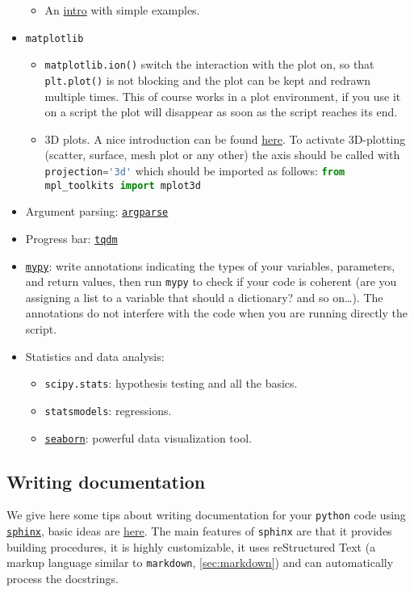 \documentclass[a4paper,12pt,%
              final%
              ]{article}
\begin{document}
\begin{itemize}
\begin{itemize}
      \item An \href{https://www.machinelearningplus.com/python/parallel-processing-python/}{intro} with simple examples.
    \end{itemize}
  \item \texttt{matplotlib}
    \begin{itemize}
      \item \texttt{matplotlib.ion()} switch the interaction with the plot on, so that \texttt{plt.plot()} is not blocking and the plot can be kept and redrawn multiple times. This of course works in a plot environment, if you use it on a script the plot will disappear as soon as the script reaches its end.
      \item 3D plots. A nice introduction can be found \href{https://jakevdp.github.io/PythonDataScienceHandbook/04.12-three-dimensional-plotting.html}{here}. To activate 3D-plotting (scatter, surface, mesh plot or any other) the axis should be called with \lstinline[language=python]{projection='3d'} which should be imported as follows: \lstinline[language=python]{from mpl_toolkits import mplot3d}
    \end{itemize}
  \item Argument parsing: \href{https://docs.python.org/3/library/argparse.html#module-argparse}{\texttt{argparse}}
  \item Progress bar: \href{https://github.com/tqdm/tqdm#manual}{\texttt{tqdm}}
  \item \href{https://mypy.readthedocs.io/en/stable/index.html}{\texttt{mypy}}: write annotations indicating the types of your variables, parameters, and return values, then run \texttt{mypy} to check if your code is coherent (are you assigning a list to a variable that should a dictionary? and so on\ldots). The annotations do not interfere with the code when you are running directly the script.
  \item Statistics and data analysis:
    \begin{itemize}
      \item \texttt{scipy.stats}: hypothesis testing and all the basics.
      \item \texttt{statsmodels}: regressions.
      \item \href{https://seaborn.pydata.org/introduction.html}{\texttt{seaborn}}: powerful data visualization tool.
    \end{itemize}
\end{itemize}

\subsection{Writing documentation}
We give here some tips about writing documentation for your \texttt{python} code using \href{https://www.sphinx-doc.org/en/master/index.html}{\texttt{sphinx}}, basic ideas are \href{https://docs.python-guide.org/writing/documentation/}{here}. The main features of \texttt{sphinx} are that it provides building procedures, it is highly customizable, it uses reStructured Text (a markup language similar to \texttt{markdown}, \autoref{sec:markdown}) and can automatically process the docstrings.
\end{document}
